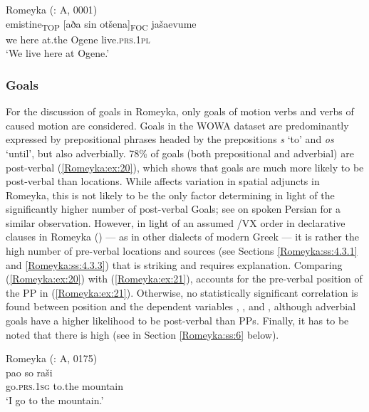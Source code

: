 \documentclass[output=paper,colorlinks,citecolor=brown]{langscibook}
\begin{document}
\ea\label{Romeyka:ex:19}
Romeyka (\citealt{schreiber2021pontic}: A, 0001) \\
\gll emistine\textsubscript{TOP} [aða sin otšena]\textsubscript{FOC} jašaevume \\
we here at.the Ogene live\textsc{.prs.1pl} \\
\glt 	`We live here at Ogene.'  \\
\z

\subsubsection{Goals}\label{Romeyka:ss:4.3.2}

For the discussion of goals in Romeyka, only goals of motion verbs and verbs of caused motion are considered. Goals in the WOWA dataset are predominantly expressed by prepositional phrases headed by the prepositions \textit{s} `to' and \textit{os} `until', but also adverbially. 78\% of goals (both prepositional and adverbial) are post-verbal (\ref{Romeyka:ex:20}), which shows that goals are much more likely to be post-verbal than locations. While  affects  variation in spatial adjuncts in Romeyka, this is not likely to be the only factor determining  in light of the significantly higher number of post-verbal Goals; see  on spoken Persian for a similar observation. However, in light of an assumed /VX order in declarative clauses in Romeyka (\citealt{neocleous_word_2020}) --- as in other dialects of modern Greek --- it is rather the high number of pre-verbal locations and sources (see Sections \ref{Romeyka:ss:4.3.1} and \ref{Romeyka:ss:4.3.3}) that is striking and requires explanation. Comparing (\ref{Romeyka:ex:20}) with (\ref{Romeyka:ex:21}),  accounts for the pre-verbal position of the PP in (\ref{Romeyka:ex:21}). Otherwise, no statistically significant correlation is found between position and the dependent variables , , and , although adverbial goals have a higher likelihood to be post-verbal than PPs. Finally, it has to be noted that there is high  (see  in Section \ref{Romeyka:ss:6} below).

\ea\label{Romeyka:ex:20}
Romeyka (\citealt{schreiber2021pontic}: A, 0175) \\
\gll pao so raši \\
go\textsc{.prs.1sg} to.the mountain \\
\glt `I go to the mountain.'  \\
\z
\end{document}
